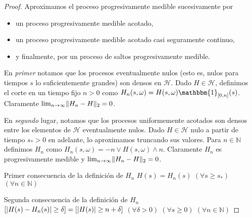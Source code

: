 \documentclass{article}
\newcommand{\characteristic}{\mathbbm{1}}
\newcommand{\naturalNumbers}{\mathbb{N}}
\DeclarePairedDelimiter{\abs}{\lvert}{\rvert}
\DeclarePairedDelimiter{\norm}{\|}{\|}
\theoremstyle{plain}
\theoremstyle{remark}
\theoremstyle{definition}
\begin{document}
\begin{proof}
  Aproximamos el proceso progresivamente medible sucesivamente por
  \begin{itemize}
    \item un proceso progresivamente medible acotado,
    \item un proceso progresivamente medible acotado casi seguramente continuo,
    \item y finalmente, por un proceso de saltos progresivamente medible.
  \end{itemize}
  
  En \emph{primer} notamos que los procesos eventualmente nulos (esto es, nulos para tiempos \(s\) lo suficientemente grandes) son densos en \(\mathcal{H}\).
  Dado \(H \in \mathcal{H}\), definimos el corte en un tiempo fijo \(n > 0\) como \(H_n(s, \omega) = H(s, \omega) \characteristic_{[0, n]}(s)\).
  Claramente \(\lim_{n \rightarrow \infty} \norm{H_n - H}_2 = 0\).

  En \emph{segundo} lugar, notamos que los procesos uniformemente acotados son densos entre los elementos de \(\mathcal{H}\) eventualmente nulos.
  Dado \(H \in \mathcal{H}\) nulo a partir de tiempo \(s_* > 0\) en adelante, lo aproximamos truncando sus valores.
  Para \(n \in \naturalNumbers\) definimos \(H_n\) como \(H_n(s, \omega) = -n \vee H(s, \omega) \wedge n\).
  Claramente \(H_n\) es progresivamente medible y \(\lim_{n \rightarrow \infty} \norm{H_n - H}_2 = 0\).


  Primer consecuencia de la definición de \(H_n\) 
  \(H(s) = H_n(s)\) \((\forall s \geq s_*)\) \((\forall n \in \naturalNumbers)\)

  Segunda consecuencia de la definición de \(H_n\) 
  \([\abs{H(s) - H_n(s)} \geq \delta] = [\abs{H(s)} \geq n + \delta]\) \((\forall \delta > 0)\) \((\forall s \geq 0)\) \((\forall n \in \naturalNumbers)\)


\end{proof}
\end{document}

